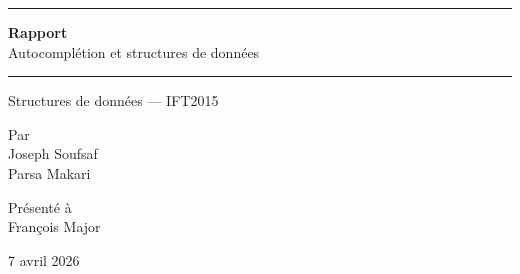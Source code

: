 \documentclass[12pt,a4paper]{article}
\begin{document}

\begin{titlepage}
  \centering

  \textcolor{udemblue}{\rule{\linewidth}{2.5pt}}
  \vspace{8pt}

  {\Huge\bfseries Rapport}\\[6pt]
  {\Large Autocomplétion et structures de données}

  \vspace{6pt}
  \textcolor{udemblue}{\rule{\linewidth}{2.5pt}}

  \vspace{18mm}
  {\Large Structures de données — IFT2015}

  \vspace{28mm}
  {\large Par\\[6pt]
  Joseph Soufsaf\\
  Parsa Makari}

  \vspace{22mm}
  {\large Présenté à\\[6pt]
  François Major}

  \vspace{22mm}
  {\large 7 avril 2026}

  \vspace*{\fill}


\end{titlepage}
\end{document}
